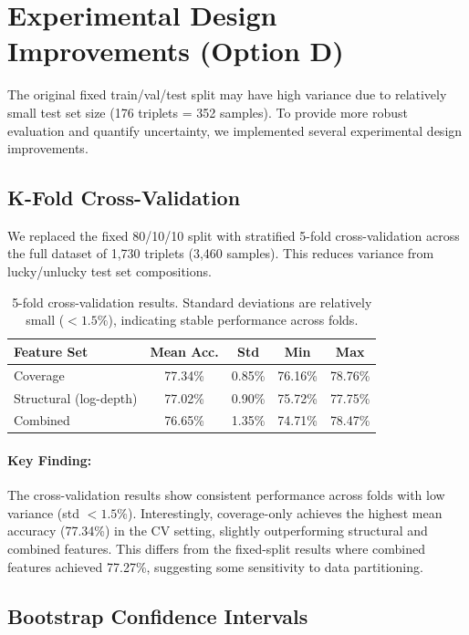 \documentclass[12pt,a4paper]{article}
\begin{document}
\section{Experimental Design Improvements (Option D)}

The original fixed train/val/test split may have high variance due to relatively small test set
size (176 triplets = 352 samples). To provide more robust evaluation and quantify uncertainty,
we implemented several experimental design improvements.

\subsection{K-Fold Cross-Validation}

We replaced the fixed 80/10/10 split with stratified 5-fold cross-validation across the full
dataset of 1,730 triplets (3,460 samples). This reduces variance from lucky/unlucky test set
compositions.

\begin{table}[h]
\centering
\begin{tabular}{lcccc}
\hline
\textbf{Feature Set} & \textbf{Mean Acc.} & \textbf{Std} & \textbf{Min} & \textbf{Max} \\
\hline
Coverage & 77.34\% & 0.85\% & 76.16\% & 78.76\% \\
Structural (log-depth) & 77.02\% & 0.90\% & 75.72\% & 77.75\% \\
Combined & 76.65\% & 1.35\% & 74.71\% & 78.47\% \\
\hline
\end{tabular}
\caption{5-fold cross-validation results. Standard deviations are relatively small ($<1.5\%$),
indicating stable performance across folds.}
\label{tab:cv_results}
\end{table}

\paragraph{Key Finding:} The cross-validation results show consistent performance across folds
with low variance (std $<1.5\%$). Interestingly, coverage-only achieves the highest mean accuracy
(77.34\%) in the CV setting, slightly outperforming structural and combined features. This differs
from the fixed-split results where combined features achieved 77.27\%, suggesting some sensitivity
to data partitioning.

\subsection{Bootstrap Confidence Intervals}
\end{document}
